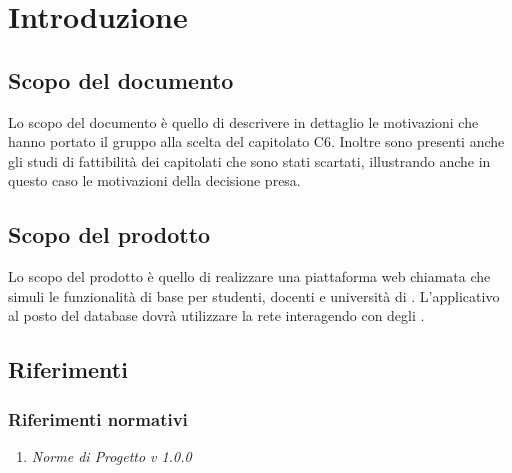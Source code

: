 \documentclass[StudioDiFattibilità.tex]{subfiles}
\begin{document}
\chapter{Introduzione}
\section{Scopo del documento}
Lo scopo del documento è quello di descrivere in dettaglio le motivazioni che hanno portato il gruppo alla scelta del capitolato C6. Inoltre sono presenti anche gli studi di fattibilità dei capitolati che sono stati scartati, illustrando anche in questo caso le motivazioni della decisione presa.
\section{Scopo del prodotto}
Lo scopo del prodotto è quello di realizzare una piattaforma web chiamata \progetto che simuli le funzionalità di base per studenti, docenti e università di . L'applicativo al posto del database dovrà utilizzare la rete  interagendo con degli .

\glossExpl

\section{Riferimenti}
\subsection{Riferimenti normativi}
\begin{enumerate}
	\item \textit{Norme di Progetto v 1.0.0}
\end{enumerate}
\end{document}
